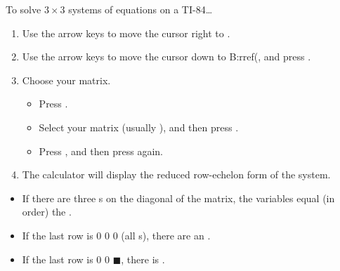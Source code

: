 \begin{center}
\begin{minipage}[t]{1\textwidth}
\begin{myConcept}{To solve $3\times3$ systems of equations on a {\scshape TI-84}\dots}
\begin{enumerate}
        \item Use the arrow keys to move the cursor right to {\ttfamily [MATH]}.
        \item Use the arrow keys to move the cursor down to {\ttfamily B:rref(},
            and press .
        \item Choose your matrix.
            \begin{itemize}
                \item Press  .
                \item Select your matrix (usually {\ttfamily [A]}), 
                    and then press .
                \item Press \myButton{)}, and then press  again.
            \end{itemize}
        \item The calculator will display the reduced row-echelon form 
            of the system.
    \end{enumerate}
    \begin{itemize}
        \item If there are three {}s on the diagonal of the matrix, 
            the variables equal (in order) the 
            .
        \item If the last row is { 0 0 0} (all {}s), 
            there are an .
        \item If the last row is { 0 0 $\blacksquare$}, 
            there is .
    \end{itemize}
\end{myConcept}

\end{minipage}
\end{center}
    
    